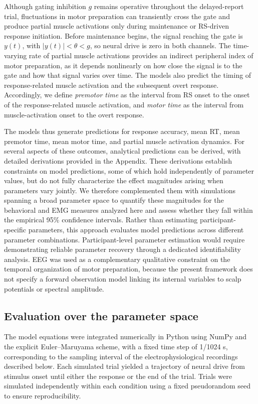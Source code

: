 \documentclass[a4paper,11pt]{article}
\theoremstyle{definition}
\newcommand{\1}{\mathbbm{1}}
\begin{document}
Although gating inhibition $g$ remains operative throughout the
delayed-report trial, fluctuations in motor preparation can transiently
cross the gate and produce partial muscle activations only during
maintenance or RS-driven response initiation. Before maintenance begins,
the signal reaching the gate is $y(t)$, with $|y(t)|<\theta<g$, so neural
drive is zero in both channels. The time-varying rate of partial muscle activations provides an indirect peripheral index of motor preparation, as it depends nonlinearly on how close the signal is to the gate and how that signal varies over time. The models also predict the timing of response-related muscle activation and the subsequent overt response. Accordingly, we define \emph{premotor time} as the interval from RS onset to the onset of the response-related muscle activation, and \emph{motor time} as the interval from muscle-activation onset to the overt response.

The models thus generate predictions for response accuracy, mean RT, mean premotor time, mean motor time, and partial muscle activation dynamics. For several aspects of these outcomes, analytical predictions can be derived, with detailed derivations provided in the Appendix. These derivations establish constraints on model predictions, some of which hold independently of parameter values, but do not fully characterize the effect magnitudes arising when parameters vary jointly. We therefore complemented them with simulations spanning a broad parameter space to quantify these magnitudes for the behavioral and EMG measures analyzed here and assess whether they fall within the empirical 95\% confidence intervals. Rather than estimating participant-specific parameters, this approach evaluates model predictions across different parameter combinations. Participant-level parameter estimation would require demonstrating reliable parameter recovery through a dedicated identifiability analysis. EEG was used as a complementary qualitative constraint on the temporal organization of motor preparation, because the present framework does not specify a forward observation model linking its internal variables to scalp potentials or spectral amplitude.


\subsection{Evaluation over the parameter space}

The model equations were integrated numerically in Python using NumPy and the explicit Euler--Maruyama scheme, with a fixed time step of 1/1024 s, corresponding to the sampling interval of the electrophysiological recordings described below. Each simulated trial yielded a trajectory of neural drive from stimulus onset until either the response or the end of the trial. Trials were simulated independently within each condition using a fixed pseudorandom seed to ensure reproducibility.
\end{document}

